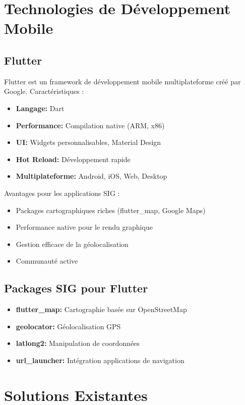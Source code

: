 \documentclass[12pt,a4paper]{report}
\begin{document}
\section{Technologies de Développement Mobile}

\subsection{Flutter}

Flutter est un framework de développement mobile multiplateforme créé par Google. Caractéristiques :

\begin{itemize}
    \item \textbf{Langage:} Dart
    \item \textbf{Performance:} Compilation native (ARM, x86)
    \item \textbf{UI:} Widgets personnalisables, Material Design
    \item \textbf{Hot Reload:} Développement rapide
    \item \textbf{Multiplateforme:} Android, iOS, Web, Desktop
\end{itemize}

Avantages pour les applications SIG :
\begin{itemize}
    \item Packages cartographiques riches (flutter\_map, Google Maps)
    \item Performance native pour le rendu graphique
    \item Gestion efficace de la géolocalisation
    \item Communauté active
\end{itemize}

\subsection{Packages SIG pour Flutter}

\begin{itemize}
    \item \textbf{flutter\_map:} Cartographie basée sur OpenStreetMap
    \item \textbf{geolocator:} Géolocalisation GPS
    \item \textbf{latlong2:} Manipulation de coordonnées
    \item \textbf{url\_launcher:} Intégration applications de navigation
\end{itemize}

\section{Solutions Existantes}
\end{document}
